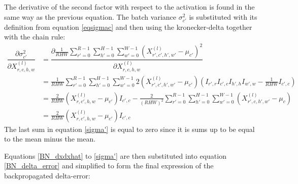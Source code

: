 \documentclass[a4paper,11pt,twoside]{article}
\newcommand*{\pd}[2]{\ensuremath{\dfrac{\partial #1}{\partial #2}}}
\begin{document}
The derivative of the second factor with respect to the activation is found in the same way as the previous equation. The batch variance $\sigma^2_{c'}$ is substituted with its definition from equation \eqref{eqsigmac} and then using the kronecker-delta together with the chain rule: \cite{webBN1} \cite{webBN2}
\begin{equation}\label{sigma'}
\begin{split}
\pd{\sigma^2_{c'}}{{X}^{(l)}_{r,c,h,w}}
	& = \pd{\frac{1}{RHW} \sum\limits^{R-1}_{r'=0} \sum\limits^{H-1}_{h'=0} \sum\limits^{W-1}_{w'=0} ({X^{(l)}_{r',c',h',w'} - \mu_{c'}})^2}{{X}^{(l)}_{r,c,h,w}} \\
	& = \frac{1}{RHW} \sum\limits^{R-1}_{r'=0} \sum\limits^{H-1}_{h'=0} \sum\limits^{W-1}_{w'=0} 2 ({X^{(l)}_{r',c',h',w'} - \mu_{c'}}) (I_{r',r} I_{c',c} I_{h',h} I_{w',w} - \frac{1}{RHW} I_{c',c}) \\
	& = \frac{2}{RHW} ({X^{(l)}_{r,c',h,w} - \mu_{c'}})I_{c',c} - \frac{2}{(RHW)^2}  \sum\limits^{R-1}_{r'=0} \sum\limits^{H-1}_{h'=0} \sum\limits^{W-1}_{w'=0} ({X^{(l)}_{r',c,h',w'} - \mu_{c}}) \\
	& = \frac{2}{RHW} ({X^{(l)}_{r,c',h,w} - \mu_{c'}})I_{c',c}
\end{split}
\end{equation}
The last sum in equation \eqref{sigma'} is equal to zero since it is sums up to be equal to the mean minus the mean.

Equations \eqref{BN_dxdxhat} to \eqref{sigma'} are then substituted into equation \eqref{BN_delta_error} and simplified to form the final expression of the backpropagated delta-error:
\end{document}
